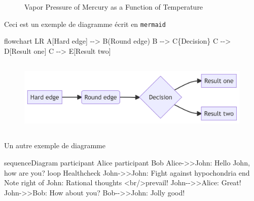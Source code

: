 \documentclass[
  a4paper,
]{scrbook}
\newenvironment{Shaded}{}{}
\newcommand{\NormalTok}[1]{\textcolor[rgb]{0.14,0.16,0.18}{#1}}
\begin{document}
\begin{figure}
\begin{minipage}[t]{0.50\linewidth}
{{}

\caption{Vapor Pressure of Mercury as a Function of Temperature}

}

\end{minipage}%

\end{figure}

Ceci est un exemple de diagramme écrit en \texttt{mermaid}

\begin{Shaded}
\begin{Highlighting}[numbers=left,,]

\NormalTok{flowchart LR}
\NormalTok{  A[Hard edge] {-}{-}\textgreater{} B(Round edge)}
\NormalTok{  B {-}{-}\textgreater{} C\{Decision\}}
\NormalTok{  C {-}{-}\textgreater{} D[Result one]}
\NormalTok{  C {-}{-}\textgreater{} E[Result two]}
\end{Highlighting}
\end{Shaded}

\begin{figure}[H]

{\centering \includegraphics[width=5.74in,height=1.4in]{./resultats_files/figure-latex/mermaid-figure-1.png}

}

\end{figure}

Un autre exemple de diagramme

\begin{Shaded}
\begin{Highlighting}[numbers=left,,]

\NormalTok{sequenceDiagram}
\NormalTok{  participant Alice}
\NormalTok{  participant Bob}
\NormalTok{  Alice{-}\textgreater{}\textgreater{}John: Hello John, how are you?}
\NormalTok{  loop Healthcheck}
\NormalTok{    John{-}\textgreater{}\textgreater{}John: Fight against hypochondria}
\NormalTok{  end}
\NormalTok{  Note right of John: Rational thoughts \textless{}br/\textgreater{}prevail!}
\NormalTok{  John{-}{-}\textgreater{}\textgreater{}Alice: Great!}
\NormalTok{  John{-}\textgreater{}\textgreater{}Bob: How about you?}
\NormalTok{  Bob{-}{-}\textgreater{}\textgreater{}John: Jolly good!}
\end{Highlighting}
\end{Shaded}
\end{document}
